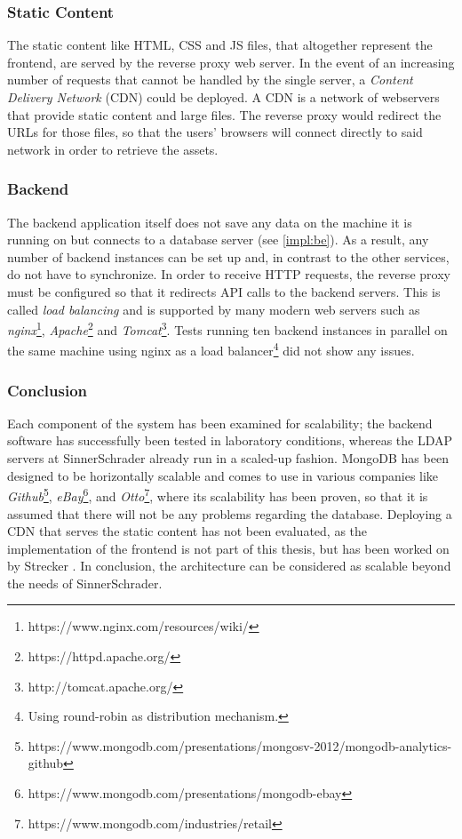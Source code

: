 \subsubsection{Static Content}
The static content like HTML, CSS and JS files, that altogether represent the frontend, are
served by the reverse proxy web server. In the event of an increasing number of requests that cannot be handled by the single server, a \textit{Content Delivery Network} (CDN) could be deployed. A CDN is a network of webservers that provide static content and large files. The reverse proxy would redirect the URLs for those files, so that the users' browsers will connect directly to said network in order to retrieve the assets.

\subsubsection{Backend}
The backend application itself does not save any data on the machine it is running on but connects to a database server (see \ref{impl:be}). As a result, any number of backend instances can be set up and, in contrast to the other services, do not have to synchronize. In order to receive HTTP requests, the reverse proxy must be configured so that it redirects API calls to the backend servers. This is called \textit{load balancing} and is supported by many modern web servers such as \textit{nginx}\footnote{https://www.nginx.com/resources/wiki/}, \textit{Apache}\footnote{https://httpd.apache.org/} and \textit{Tomcat}\footnote{http://tomcat.apache.org/}. Tests running ten backend instances in parallel on the same machine using nginx as a load balancer\footnote{Using round-robin as distribution mechanism.} did not show any issues.

\newpage

\subsubsection{Conclusion}
Each component of the system has been examined for scalability; the backend software has successfully been tested in laboratory conditions, whereas the LDAP servers at SinnerSchrader already run in a scaled-up fashion. MongoDB has been designed to be horizontally scalable and comes to use in various companies like
\textit{Github}\footnote{https://www.mongodb.com/presentations/mongosv-2012/mongodb-analytics-github},
\textit{eBay}\footnote{https://www.mongodb.com/presentations/mongodb-ebay}, and
\textit{Otto}\footnote{https://www.mongodb.com/industries/retail}, where its scalability has been proven, so that it is assumed that there will not be any problems regarding the database.
Deploying a CDN that serves the static content has not been evaluated, as the implementation of the frontend is not part of this thesis, but has been worked on by Strecker \cite{strecker}. In conclusion, the architecture can be considered as scalable beyond the needs of SinnerSchrader.


